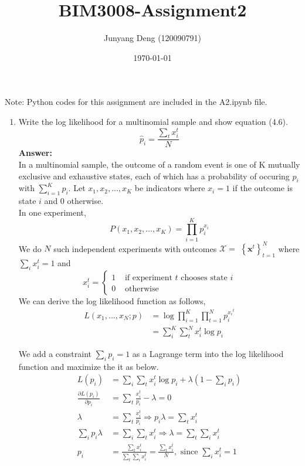 \documentclass{article}
\title{BIM3008-Assignment2}
\author{Junyang Deng (120090791)}
\date{\today}
\begin{document}
 
\maketitle
Note: Python codes for this assignment are included in the A2.ipynb file.
\begin{enumerate}
    \item Write the log likelihood for a multinomial sample and show equation (4.6). %
    $$
    \hat{p}_i=\frac{\sum_t x_i^t}{N}
    $$
    \textbf{Answer:} \\
    In a multinomial sample, the outcome of a random event is one of K mutually exclusive and exhaustive states, each of which has a probability of occuring $p_i$ with $\sum^K_{i=1}p_i$. Let $x_1, x_2,...,x_K$ be indicators where $x_i=1$ if the outcome is state $i$ and 0 otherwise.\\
    In one experiment, 
    $$
    P\left(x_1, x_2, \ldots, x_K\right)=\prod_{i=1}^K p_i^{x_i}
    $$
    We do $N$ such independent experiments with outcomes $\mathcal{X}=$ $\left\{\boldsymbol{x}^t\right\}_{t=1}^N$ where $\sum_i x_i^t=1$ and
    $$
    x_i^t= \begin{cases}1 & \text { if experiment } t \text { chooses state } i \\ 0 & \text { otherwise }\end{cases}$$
    We can derive the log likelihood function as follows,
    $$
    \begin{aligned}
    L(x_1, ..., x_N; p)&=\log \prod_{i=1}^K \prod_{t=1}^N p_i^{{x_i}^t}\\
    &=\sum_i^K \sum_t^N x_i^t \log p_i
    \end{aligned}
    $$

    We add a constraint $\sum_i p_i=1$ as a Lagrange term into the log likelihood function and maximize the it as below.
    $$
    \begin{aligned}
    L\left(p_i\right) &=\sum_i \sum_t x_i^t \log p_i+\lambda\left(1-\sum_i p_i\right) \\
    \frac{\partial L(p_i)}{\partial p_i} &=\sum_t\frac{x_i^t}{p_i}-\lambda=0 \\
    \lambda &=\sum_t\frac{x_i^t}{p_i} \Rightarrow p_i \lambda=\sum_t x_i^t \\
    \sum_i p_i \lambda &=\sum_i \sum_t x_i^t \Rightarrow \lambda=\sum_t \sum_i x_i^t \\
    p_i &=\frac{\sum_t x_i^t}{\sum_t \sum_i x_i^t}=\frac{\sum_t x_i^t}{N}, \text{ since } \sum_i x_i^t=1
    \end{aligned}
    $$



\end{enumerate}
\end{document}

